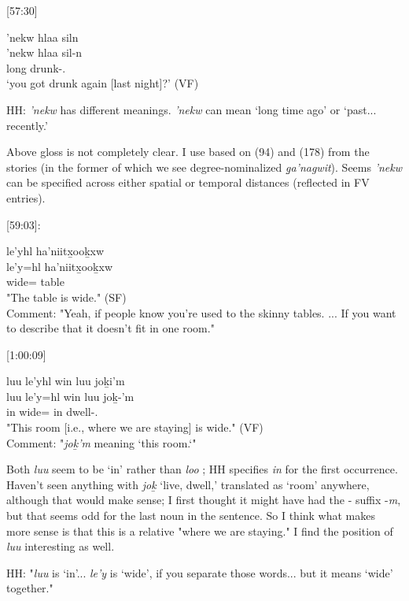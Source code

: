 [57:30]
\begin{exe}
    \ex \glll
    'nekw hlaa siln \\
    'nekw hlaa sil-n \\
    long \Incep{} drunk-\Ssg.\Ii \\
    \glt `you got drunk again [last night]?' (VF)
\end{exe}

HH: \textit{'nekw} has different meanings. \textit{'nekw} can mean `long time ago' or `past... recently.' 

Above gloss is not completely clear. I use \Incep{} based on (94) and (178) from the stories (in the former of which we see degree-nominalized \textit{g̱a’nagwit}). Seems \textit{'nekw} can be specified across either spatial or temporal distances (reflected in FV entries).

[59:03]:
\begin{exe}
    \ex \glll 
    le’yhl ha’niitx̱ooḵxw \\ 
    le’y=hl ha’niitx̱ooḵxw \\ 
    wide=\Cn{} table \\
    \glt "The table is wide." (SF) \\
    Comment: "Yeah, if people know you're used to the skinny tables. ... If you want to describe that it doesn't fit in one room."
\end{exe}

[1:00:09]
\begin{exe}
    \ex \glll
    luu le'yhl win luu joḵi'm \\
    luu le'y=hl win luu joḵ-'m \\
    in wide=\Cn{} \Comp{} in dwell-\Fpl.\Ii \\
    \glt "This room [i.e., where we are staying] is wide." (VF) \\
    Comment: "\textit{joḵ'm} meaning `this room.`"
\end{exe}

Both \textit{luu} seem to be `in' rather than \textit{loo} \Obl; HH specifies \textit{in} for the first occurrence. Haven't seen anything with \textit{joḵ} `live, dwell,' translated as `room' anywhere, although that would make sense; I first thought it might have had the -\Attr{} suffix -\textit{m}, but that seems odd for the last noun in the sentence. So I think what makes more sense is that this is a relative "where we are staying." I find the position of \textit{luu} interesting as well. 

HH: "\textit{luu} is `in'... \textit{le'y} is `wide', if you separate those words... but it means `wide' together."

